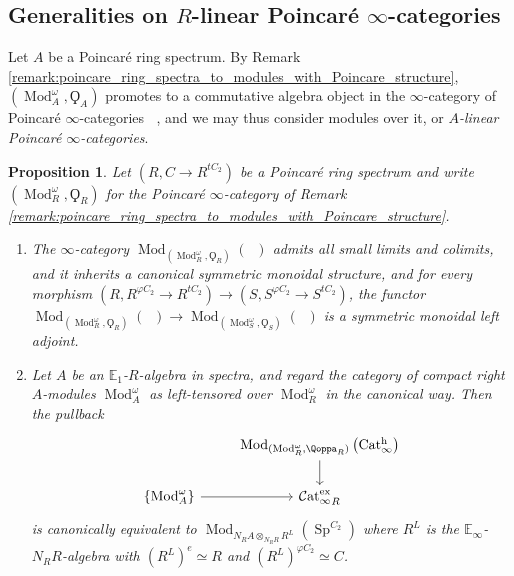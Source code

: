 \documentclass{article}
\DeclareMathOperator{\Cat}{\mathcal{C}at} %
\DeclareMathOperator{\Catex}{\Cat_\infty^{ex}} %
\DeclareMathOperator{\Cath}{Cat^h_\infty} %
\DeclareMathOperator{\Catp}{Cat^p_\infty} %
\DeclareMathOperator{\Catpidem}{Cat^p_{\infty, idem}} %
\DeclareMathOperator{\Mod}{Mod} %
\DeclareMathOperator{\Spectra}{Sp} %
\newcommand{\EE}{\mathbb{E}}
\newtheorem{proposition}[equation]{Proposition}
\theoremstyle{definition}
\begin{document}
\subsection{Generalities on \texorpdfstring{$R$}{R}-linear Poincar\'e \texorpdfstring{$\infty$}{∞}-categories}\label{subsection:relative_Poincare_cats_generalities}
Let $A$ be a Poincaré ring spectrum. 
By Remark \ref{remark:poincare_ring_spectra_to_modules_with_Poincare_structure}, $ \left(\Mod_A^\omega,\Qoppa_A\right) $ promotes to a commutative algebra object in the $\infty$-category of Poincaré $\infty$-categories $ \Catp $, and we may thus consider modules over it, or \emph{$A$-linear Poincaré $ \infty $-categories}. 
\begin{proposition}\label{prop:relative_poincare_cats_basic_properties}
    Let $ (R, C \to R^{tC_2})$ be a Poincaré ring spectrum and write $ (\Mod_R^\omega, \Qoppa_R) $ for the Poincaré $ \infty $-category of Remark \ref{remark:poincare_ring_spectra_to_modules_with_Poincare_structure}. 
    \begin{enumerate}[label=(\arabic*)]
        \item \label{propitem:Rlin_Poincare_cats_is_symm_mon} The $ \infty $-category $ \Mod_{\left(\Mod_R^\omega, \Qoppa_R \right)}(\Catpidem) $ admits all small limits and colimits, and it inherits a canonical symmetric monoidal structure, and for every morphism $ \left(R, R^{\varphi C_2} \to R^{tC_2}\right) \to (S, S^{\varphi C_2} \to S^{tC_2}) $, the functor $ \Mod_{\left(\Mod_R^\omega, \Qoppa_R \right)}(\Catpidem) \to \Mod_{\left(\Mod_S^\omega, \Qoppa_S \right)}(\Catpidem) $ is a symmetric monoidal left adjoint. 
        \item \label{propitem:classify_R_lin_hermitian_struct} Let $ A $ be an $ \EE_1 $-$ R $-algebra in spectra, and regard the category of compact right $ A $-modules $ \Mod_A^\omega $ as left-tensored over $ \Mod_R^\omega $ in the canonical way. 
        Then the pullback
        \begin{equation}
        \begin{tikzcd}
            & \Mod_{(\Mod_R^\omega, \Qoppa_R)}\left(\Cath\right) \ar[d] \\
            \{\Mod_A^\omega\} \ar[r] & \Catex_R
        \end{tikzcd}
        \end{equation}
        is canonically equivalent to $ \Mod_{N_R A \otimes_{N_R R} R^L }\left(\Spectra^{C_2}\right) $ where $ R^L $ is the $ \EE_\infty $-$ N_R R $-algebra with $ (R^L)^e \simeq R $ and $ (R^L)^{\varphi C_2}  \simeq C $. 


\end{enumerate}
\end{proposition}
\end{document}
